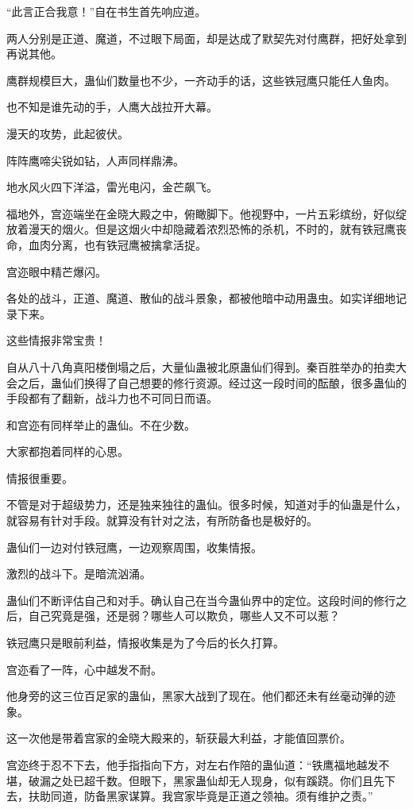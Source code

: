 \begin{this_body}
“此言正合我意！”自在书生首先响应道。

两人分别是正道、魔道，不过眼下局面，却是达成了默契先对付鹰群，把好处拿到再说其他。

鹰群规模巨大，蛊仙们数量也不少，一齐动手的话，这些铁冠鹰只能任人鱼肉。

也不知是谁先动的手，人鹰大战拉开大幕。

漫天的攻势，此起彼伏。

阵阵鹰啼尖锐如钻，人声同样鼎沸。

地水风火四下洋溢，雷光电闪，金芒飙飞。

福地外，宫迩端坐在金晓大殿之中，俯瞰脚下。他视野中，一片五彩缤纷，好似绽放着漫天的烟火。但是这烟火中却隐藏着浓烈恐怖的杀机，不时的，就有铁冠鹰丧命，血肉分离，也有铁冠鹰被擒拿活捉。

宫迩眼中精芒爆闪。

各处的战斗，正道、魔道、散仙的战斗景象，都被他暗中动用蛊虫。如实详细地记录下来。

这些情报非常宝贵！

自从八十八角真阳楼倒塌之后，大量仙蛊被北原蛊仙们得到。秦百胜举办的拍卖大会之后，蛊仙们换得了自己想要的修行资源。经过这一段时间的酝酿，很多蛊仙的手段都有了翻新，战斗力也不可同日而语。

和宫迩有同样举止的蛊仙。不在少数。

大家都抱着同样的心思。

情报很重要。

不管是对于超级势力，还是独来独往的蛊仙。很多时候，知道对手的仙蛊是什么，就容易有针对手段。就算没有针对之法，有所防备也是极好的。

蛊仙们一边对付铁冠鹰，一边观察周围，收集情报。

激烈的战斗下。是暗流汹涌。

蛊仙们不断评估自己和对手。确认自己在当今蛊仙界中的定位。这段时间的修行之后，自己究竟是强，还是弱？哪些人可以欺负，哪些人又不可以惹？

铁冠鹰只是眼前利益，情报收集是为了今后的长久打算。

宫迩看了一阵，心中越发不耐。

他身旁的这三位百足家的蛊仙，黑家大战到了现在。他们都还未有丝毫动弹的迹象。

这一次他是带着宫家的金晓大殿来的，斩获最大利益，才能值回票价。

宫迩终于忍不下去，他手指指向下方，对左右作陪的蛊仙道：“铁鹰福地越发不堪，破漏之处已超千数。但眼下，黑家蛊仙却无人现身，似有蹊跷。你们且先下去，扶助同道，防备黑家谋算。我宫家毕竟是正道之领袖。须有维护之责。”


\end{this_body}
